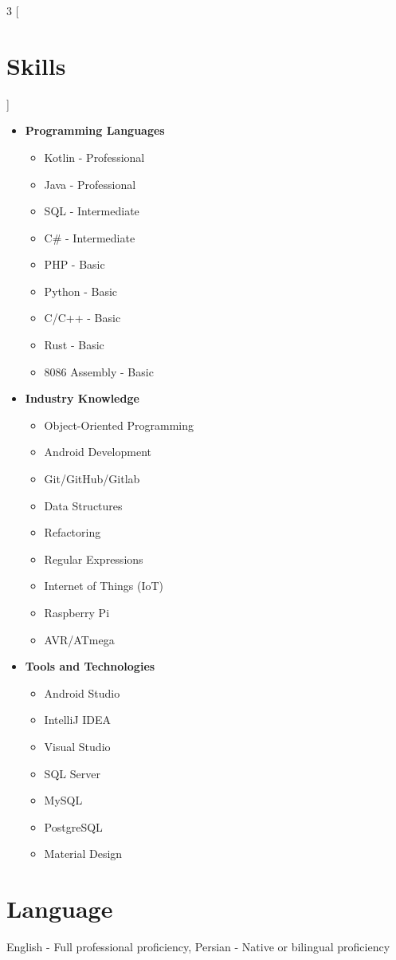 \begin{multicols}{3}
[\section*{\LARGE{Skills}}]
    \begin{itemize}
        \item \textbf{Programming Languages}
        \begin{itemize}
            \item Kotlin - Professional
            \item Java - Professional
            \item SQL - Intermediate
            \item C\# - Intermediate
            \item PHP - Basic
            \item Python - Basic
            \item C/C++ - Basic
            \item Rust - Basic
            \item 8086 Assembly - Basic
        \end{itemize}
        \item \textbf{Industry Knowledge}
        \begin{itemize}
            \item Object-Oriented Programming
            \item Android Development
            \item Git/GitHub/Gitlab
            \item Data Structures
            \item Refactoring
            \item Regular Expressions
            \item Internet of Things (IoT)
            \item Raspberry Pi
            \item AVR/ATmega
        \end{itemize}
        \item \textbf{Tools and Technologies}
        \begin{itemize}
            \item Android Studio
            \item IntelliJ IDEA
            \item Visual Studio
            \item SQL Server
            \item MySQL
            \item PostgreSQL
            \item Material Design
        \end{itemize}
    \end{itemize}
\end{multicols}

\section*{Language}
English - Full professional proficiency, \qquad\qquad\qquad Persian - Native or bilingual proficiency